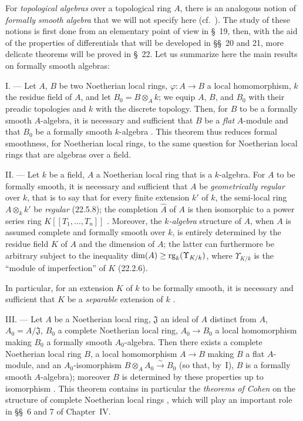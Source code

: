 \begin{env}[19.0.2]
\label{0.19.0.2}
For \emph{topological algebras} over a topological ring $A$, there is an analogous notion of \emph{formally smooth algebra} that we will not specify here (cf.~).
The study of these notions is first done from an elementary point of view in \S~19, then, with the aid of the properties of differentials that will be developed in \S\S~20 and 21, more delicate theorems will be proved in \S~22.
Let us summarize here the main results on formally smooth algebras:

\medskip\noindent I. ---
Let $A$, $B$ be two Noetherian local rings, $\varphi:A\to B$ a local homomorphism, $k$ the residue field of $A$, and let $B_0=B\otimes_A k$;
we equip $A$, $B$, and $B_0$ with their preadic topologies and $k$ with the discrete topology.
Then, for $B$ to be a formally smooth $A$-algebra, it is necessary and sufficient that $B$ be a \emph{flat} $A$-module and that $B_0$ be a formally smooth $k$-algebra .
This theorem thus reduces formal smoothness, for Noetherian local rings, to the same question for Noetherian local rings that are algebras over a field.

\medskip\noindent II. ---
Let $k$ be a field, $A$ a Noetherian local ring that is a $k$-algebra.
For $A$ to be formally smooth, it is necessary and sufficient that $A$ be \emph{geometrically regular} over $k$, that is to say that for every finite extension $k'$ of $k$, the semi-local ring $A\otimes_k k'$ be
\emph{regular} (22.5.8); the completion $\widehat{A}$ of $A$ is then isomorphic to a power series ring $K[[T_1,\ldots,T_n]]$ .
Moreover, the \emph{$k$-algebra} structure of $A$, when $A$ is assumed complete and formally smooth over $k$, is entirely determined by the residue field $K$ of $A$ and the dimension of $A$;
the latter can furthermore be arbitrary subject to the inequality $\dim(A)\geq\operatorname{rg}_k(\Upsilon_{K/k})$, where $\Upsilon_{K/k}$ is the ``module of imperfection'' of $K$ (22.2.6).

In particular, for an extension $K$ of $k$ to be formally smooth, it is necessary and sufficient that $K$ be a \emph{separable} extension of $k$ .

\medskip\noindent III. ---
Let $A$ be a Noetherian local ring, $\mathfrak{J}$ an ideal of $A$ distinct from $A$, $A_0=A/\mathfrak{J}$, $B_0$ a complete Noetherian local ring, $A_0\to B_0$ a local homomorphism making $B_0$ a formally smooth $A_0$-algebra.
Then there exists a complete Noetherian local ring $B$, a local homomorphism $A\to B$ making $B$ a flat $A$-module, and an $A_0$-isomorphism $B\otimes_A A_0\xrightarrow{\sim}B_0$ (so that, by~I), $B$ is a formally smooth $A$-algebra);
moreover $B$ is determined by these properties up to isomorphism .
This theorem contains in particular the \emph{theorems of Cohen} on the structure of complete Noetherian local rings , which will play an important role in \S\S~6 and 7 of Chapter~IV.


\end{env}

